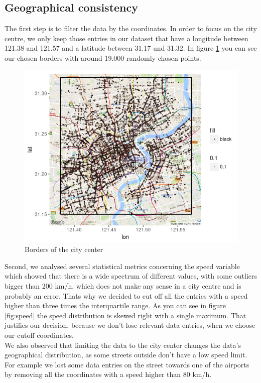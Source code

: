 \documentclass[11pt,conference,a4paper,onecolumn,romanappendices]{IEEEtran}
\begin{document}
\subsection{Geographical consistency}
The first step is to filter the data by the coordinates. In order to focus on the city centre, we only keep those entries in our dataset that have a longitude between 121.38 and 121.57 and a latitude between 31.17 und 31.32. In figure \ref{fig:borders} you can see our chosen borders with around 19.000 randomly chosen points.\\
\begin{figure}[h]
\centering
\includegraphics[scale=0.9]{borders.png}
\caption{\label{fig:borders}Borders of the city center}
\end{figure}
Second, we analysed several statistical metrics concerning the speed variable which showed that there is a wide spectrum of different values, with some outliers bigger than 200 km/h, which does not make any sense in a city centre and is probably an error. Thats why we decided to cut off all the entries with a speed higher than three times the interquartile range. As you can see in figure \ref{fig:speed} the speed distribution is skewed right with a single maximum. That justifies our decision, because we don't lose relevant data entries, when we choose our cutoff coordinates. \\
We also observed that limiting the data to the city center changes the data's geographical distribution, as some streets outside don't have a low speed limit. For example we lost some data entries on the street towards one of the airports by removing all the coordinates with a speed higher than 80 km/h. \\
\end{document}
